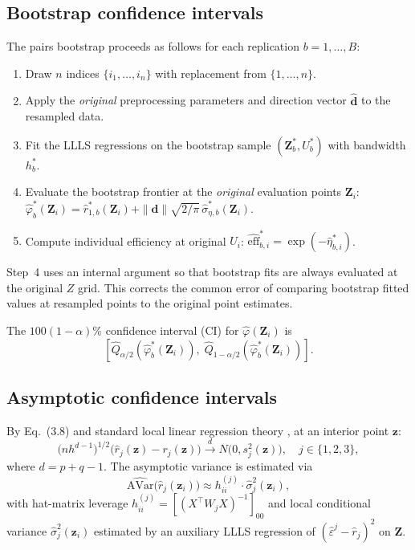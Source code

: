 \documentclass[article]{jss}
\begin{document}
\subsection{Bootstrap confidence intervals}
\label{sec:bootstrap}

The pairs bootstrap proceeds as follows for each replication
$b = 1,\ldots,B$:
\begin{enumerate}
  \item Draw $n$ indices $\{i_1,\ldots,i_n\}$ with replacement from
        $\{1,\ldots,n\}$.
  \item Apply the \emph{original} preprocessing parameters and direction
        vector $\hat{\mathbf{d}}$ to the resampled data.
  \item Fit the LLLS regressions on the bootstrap sample
        $(\mathbf{Z}^*_b, U^*_b)$ with bandwidth $h^*_b$.
  \item Evaluate the bootstrap frontier at the \emph{original} evaluation
        points $\mathbf{Z}_i$:
        $\hat{\varphi}^*_b(\mathbf{Z}_i) = \hat{r}^*_{1,b}(\mathbf{Z}_i)
         + \|\hat{\mathbf{d}}\|\sqrt{2/\pi}\,\hat{\sigma}^*_{\eta,b}(\mathbf{Z}_i)$.
  \item Compute individual efficiency at original $U_i$:
        $\widehat{\mathrm{eff}}^*_{b,i} = \exp(-\hat{\eta}^*_{b,i})$.
\end{enumerate}
Step~4 uses an internal  argument so that bootstrap fits
are always evaluated at the original $Z$ grid.  This corrects the common
error of comparing bootstrap fitted values at resampled points to the
original point estimates.

The $100(1-\alpha)\%$ confidence interval (CI) for
$\hat{\varphi}(\mathbf{Z}_i)$ is
%
\begin{equation}
  \left[\hat{Q}_{\alpha/2}\!\left(\hat{\varphi}^*_b(\mathbf{Z}_i)\right),\;
         \hat{Q}_{1-\alpha/2}\!\left(\hat{\varphi}^*_b(\mathbf{Z}_i)\right)\right].
\end{equation}

\subsection{Asymptotic confidence intervals}
\label{sec:asymptotic}

By \citet{SimarWilson2023} Eq.~(3.8) and standard local linear regression
theory \citep{FanGijbels1996}, at an interior point $\mathbf{z}$:
%
\begin{equation}
  \bigl(nh^{d-1}\bigr)^{1/2}
  \bigl(\hat{r}_j(\mathbf{z}) - r_j(\mathbf{z})\bigr)
  \xrightarrow{d} N\!\bigl(0, s^2_j(\mathbf{z})\bigr),
  \quad j \in \{1,2,3\},
\end{equation}
%
where $d = p+q-1$.  The asymptotic variance is estimated via
%
\begin{equation}
  \widehat{\mathrm{AVar}}\bigl(\hat{r}_j(\mathbf{z}_i)\bigr)
  \approx h^{(j)}_{ii} \cdot \hat{\sigma}^2_j(\mathbf{z}_i),
\end{equation}
%
with hat-matrix leverage
$h^{(j)}_{ii} = [(X^\top W_j X)^{-1}]_{00}$
and local conditional variance
$\hat{\sigma}^2_j(\mathbf{z}_i)$ estimated by an auxiliary LLLS
regression of $(\hat{\varepsilon}^j - \hat{r}_j)^2$ on $\mathbf{Z}$.
\end{document}
